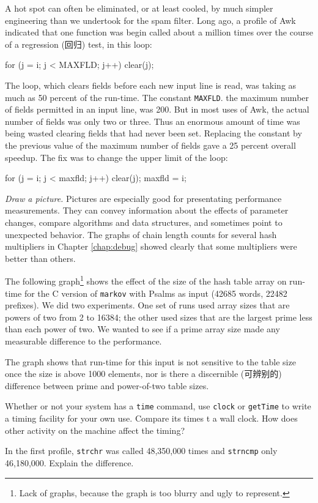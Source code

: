 A hot spot can often be eliminated, or at least cooled, by much simpler
engineering than we undertook for the spam filter. Long ago, a profile of
Awk indicated that one function was begin called about a million times over
the course of a regression (回归) test, in this loop:
\begin{badcode}
    for (j = i; j < MAXFLD; j++)
        clear(j);
\end{badcode}
The loop, which clears fields before each new input line is read, was
taking as much as 50 percent of the run-time. The constant \verb'MAXFLD'.
the maximum number of fields permitted in an input line, was 200. But in
most uses of Awk, the actual number of fields was only two or three. Thus
an enormous amount of time was being wasted clearing fields that had never
been set. Replacing the constant by the previous value of the maximum
number of fields gave a 25 percent overall speedup. The fix was to change
the upper limit of the loop:
\begin{wellcode}
    for (j = i; j < maxfld; j++)
        clear(j);
    maxfld = i;
\end{wellcode}

\emph{Draw a picture.} Pictures are especially good for presentating
performance measurements. They can convey information about the effects of
parameter changes, compare algorithms and data structures, and sometimes
point to unexpected behavior. The graphs of chain length counts for several
hash multipliers in Chapter \ref{chap:debug} showed clearly  that some
multipliers were better than others.

The following graph\footnote{Lack of graphs, because the graph is too
    blurry and ugly to represent.} shows the effect of the size of the hash
table array on run-time for the C version of \verb'markov' with Psalms as
input (42685 words, 22482 prefixes). We did two experiments. One set of
runs used array sizes that are powers of two from 2 to 16384; the other
used sizes that are the largest prime less than each power of two. We
wanted to see if a prime array size made any measurable difference to the
performance.

The graph shows that run-time for this input is not sensitive to the table
size once the size is above 1000 elements, nor is there a discernible
(可辨别的) difference between prime and power-of-two table sizes.

\begin{exercise}
    Whether or not your system has a \verb'time' command, use \verb'clock'
    or \verb'getTime' to write a timing facility for your own use. Compare
    its times t a wall clock. How does other activity on the machine affect
    the timing?
\end{exercise}
\begin{exercise}
    In the first profile, \verb'strchr' was called 48,350,000 times and
    \verb'strncmp' only 46,180,000. Explain the difference.
\end{exercise}

